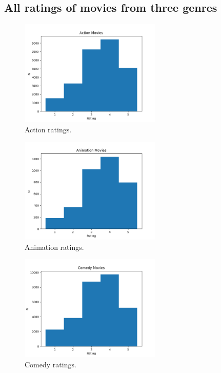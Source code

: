 \subsection{All ratings of movies from three genres}
    \begin{figure}[H]
    \centering
    \includegraphics[width=0.6\textwidth]{../Figures/Actionratings.png}
    \caption{Action ratings.}
    \end{figure}
    \begin{figure}[H]
    \centering
    \includegraphics[width=0.6\textwidth]{../Figures/Animationratings.png}
    \caption{Animation ratings.}
    \end{figure}
    \begin{figure}[H]
    \centering
    \includegraphics[width=0.6\textwidth]{../Figures/Comedyratings.png}
    \caption{Comedy ratings.}
    \end{figure}

